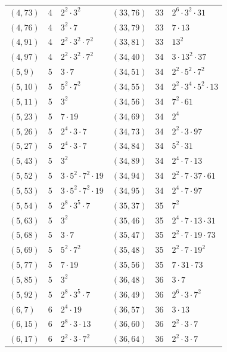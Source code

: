 \documentclass[11pt]{article}
\begin{document}
\begin{longtable}{@{}lrl@{\qquad}lrl@{}}
$(4,73)$ & 4 & $2^{2}\cdot 3^{2}$ & $(33,76)$ & 33 & $2^{6}\cdot 3^{2}\cdot 31$\\
$(4,76)$ & 4 & $3^{2}\cdot 7$ & $(33,79)$ & 33 & $7\cdot 13$\\
$(4,91)$ & 4 & $2^{2}\cdot 3^{2}\cdot 7^{2}$ & $(33,81)$ & 33 & $13^{2}$\\
$(4,97)$ & 4 & $2^{2}\cdot 3^{2}\cdot 7^{2}$ & $(34,40)$ & 34 & $3\cdot 13^{2}\cdot 37$\\
$(5,9)$ & 5 & $3\cdot 7$ & $(34,51)$ & 34 & $2^{2}\cdot 5^{2}\cdot 7^{2}$\\
$(5,10)$ & 5 & $5^{2}\cdot 7^{2}$ & $(34,55)$ & 34 & $2^{2}\cdot 3^{4}\cdot 5^{2}\cdot 13$\\
$(5,11)$ & 5 & $3^{2}$ & $(34,56)$ & 34 & $7^{2}\cdot 61$\\
$(5,23)$ & 5 & $7\cdot 19$ & $(34,69)$ & 34 & $2^{4}$\\
$(5,26)$ & 5 & $2^{4}\cdot 3\cdot 7$ & $(34,73)$ & 34 & $2^{2}\cdot 3\cdot 97$\\
$(5,27)$ & 5 & $2^{4}\cdot 3\cdot 7$ & $(34,84)$ & 34 & $5^{2}\cdot 31$\\
$(5,43)$ & 5 & $3^{2}$ & $(34,89)$ & 34 & $2^{4}\cdot 7\cdot 13$\\
$(5,52)$ & 5 & $3\cdot 5^{2}\cdot 7^{2}\cdot 19$ & $(34,94)$ & 34 & $2^{2}\cdot 7\cdot 37\cdot 61$\\
$(5,53)$ & 5 & $3\cdot 5^{2}\cdot 7^{2}\cdot 19$ & $(34,95)$ & 34 & $2^{4}\cdot 7\cdot 97$\\
$(5,54)$ & 5 & $2^{8}\cdot 3^{5}\cdot 7$ & $(35,37)$ & 35 & $7^{2}$\\
$(5,63)$ & 5 & $3^{2}$ & $(35,46)$ & 35 & $2^{4}\cdot 7\cdot 13\cdot 31$\\
$(5,68)$ & 5 & $3\cdot 7$ & $(35,47)$ & 35 & $2^{2}\cdot 7\cdot 19\cdot 73$\\
$(5,69)$ & 5 & $5^{2}\cdot 7^{2}$ & $(35,48)$ & 35 & $2^{2}\cdot 7\cdot 19^{2}$\\
$(5,77)$ & 5 & $7\cdot 19$ & $(35,56)$ & 35 & $7\cdot 31\cdot 73$\\
$(5,85)$ & 5 & $3^{2}$ & $(36,48)$ & 36 & $3\cdot 7$\\
$(5,92)$ & 5 & $2^{8}\cdot 3^{5}\cdot 7$ & $(36,49)$ & 36 & $2^{6}\cdot 3\cdot 7^{2}$\\
$(6,7)$ & 6 & $2^{4}\cdot 19$ & $(36,57)$ & 36 & $3\cdot 13$\\
$(6,15)$ & 6 & $2^{8}\cdot 3\cdot 13$ & $(36,60)$ & 36 & $2^{2}\cdot 3\cdot 7$\\
$(6,17)$ & 6 & $2^{2}\cdot 3\cdot 7^{2}$ & $(36,64)$ & 36 & $2^{2}\cdot 3\cdot 7$\\

\end{longtable}
\end{document}
